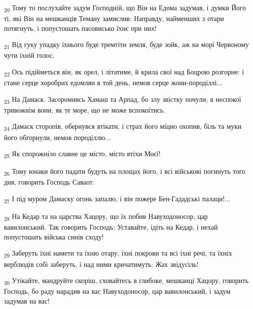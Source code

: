 \begin{tcolorbox}
\textsubscript{20} Тому то послухайте задум Господній, що Він на Едома задумав, і думки Його ті, які Він на мешканців Теману замислив: Направду, найменших з отари потягнуть, і попустошать пасовисько їхнє при них!
\end{tcolorbox}
\begin{tcolorbox}
\textsubscript{21} Від гуку упадку їхнього буде тремтіти земля, буде зойк, аж на морі Червоному чути їхній голос.
\end{tcolorbox}
\begin{tcolorbox}
\textsubscript{22} Ось підійметься він, як орел, і літатиме, й крила свої над Боцрою розгорне: і стане серце хоробрих едомлян в той день, немов серце жони-породіллі...
\end{tcolorbox}
\begin{tcolorbox}
\textsubscript{23} На Дамаск. Засоромивсь Хамаш та Арпад, бо злу звістку почули; в неспокої тривожнім вони, як те море, що не може вспокоїтись.
\end{tcolorbox}
\begin{tcolorbox}
\textsubscript{24} Дамаск сторопів, обернувся втікати, і страх його міцно охопив, біль та муки його обгорнули, немов породіллю...
\end{tcolorbox}
\begin{tcolorbox}
\textsubscript{25} Як спорожніло славне це місто, місто втіхи Моєї!
\end{tcolorbox}
\begin{tcolorbox}
\textsubscript{26} Тому юнаки його падати будуть на площах його, і всі військові погинуть того дня, говорить Господь Саваот.
\end{tcolorbox}
\begin{tcolorbox}
\textsubscript{27} І під муром Дамаску огонь запалю, і він пожере Бен-Гададські палаци!...
\end{tcolorbox}
\begin{tcolorbox}
\textsubscript{28} На Кедар та на царства Хацору, що їх побив Навуходоносор, цар вавилонський. Так говорить Господь: Уставайте, ідіть на Кедар, і нехай попустошать війська синів сходу!
\end{tcolorbox}
\begin{tcolorbox}
\textsubscript{29} Заберуть їхні намети та їхню отару, їхні покрови та всі їхні речі, та їхніх верблюдів собі заберуть, і над ними кричатимуть: Жах звідусіль!
\end{tcolorbox}
\begin{tcolorbox}
\textsubscript{30} Утікайте, мандруйте скоріш, сховайтесь в глибоке, мешканці Хацору, говорить Господь, бо раду нарадив на вас Навуходоносор, цар вавилонський, і задум задумав на вас!
\end{tcolorbox}
